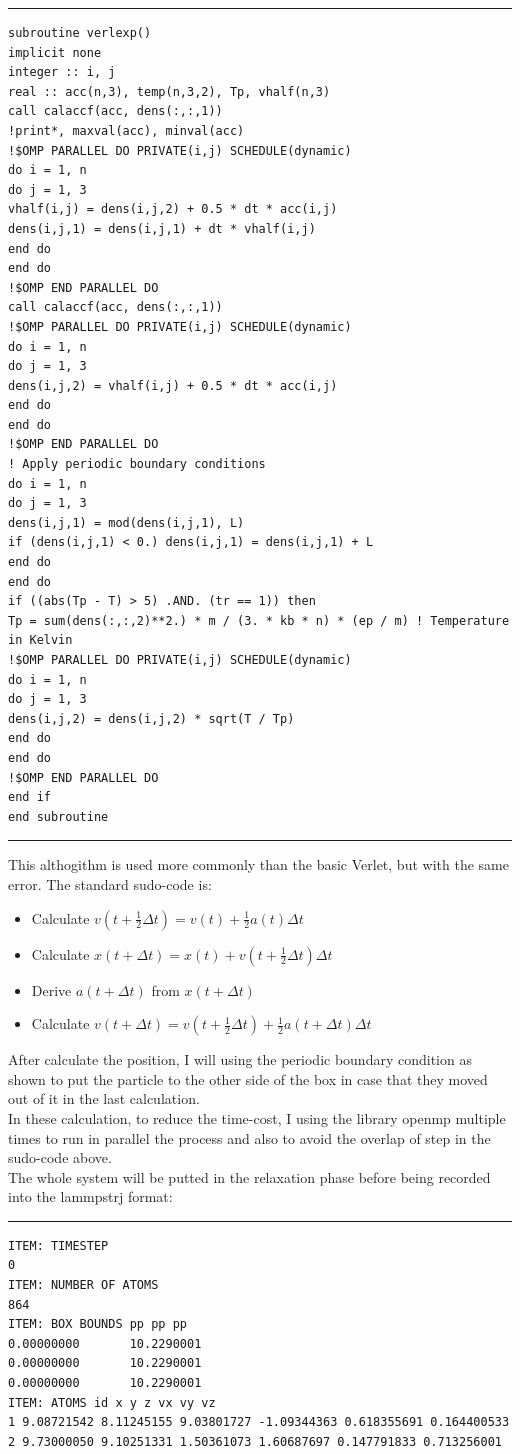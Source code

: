 \documentclass[a4paper]{article}
\begin{document}
\rule{\textwidth}{1pt}
{\small
\begin{lstlisting}
subroutine verlexp()
implicit none
integer :: i, j
real :: acc(n,3), temp(n,3,2), Tp, vhalf(n,3)
call calaccf(acc, dens(:,:,1))
!print*, maxval(acc), minval(acc)
!$OMP PARALLEL DO PRIVATE(i,j) SCHEDULE(dynamic)
do i = 1, n
do j = 1, 3
vhalf(i,j) = dens(i,j,2) + 0.5 * dt * acc(i,j)
dens(i,j,1) = dens(i,j,1) + dt * vhalf(i,j)
end do
end do
!$OMP END PARALLEL DO
call calaccf(acc, dens(:,:,1))
!$OMP PARALLEL DO PRIVATE(i,j) SCHEDULE(dynamic)
do i = 1, n
do j = 1, 3
dens(i,j,2) = vhalf(i,j) + 0.5 * dt * acc(i,j)
end do
end do
!$OMP END PARALLEL DO
! Apply periodic boundary conditions
do i = 1, n
do j = 1, 3
dens(i,j,1) = mod(dens(i,j,1), L)
if (dens(i,j,1) < 0.) dens(i,j,1) = dens(i,j,1) + L
end do
end do
if ((abs(Tp - T) > 5) .AND. (tr == 1)) then
Tp = sum(dens(:,:,2)**2.) * m / (3. * kb * n) * (ep / m) ! Temperature in Kelvin
!$OMP PARALLEL DO PRIVATE(i,j) SCHEDULE(dynamic)
do i = 1, n
do j = 1, 3
dens(i,j,2) = dens(i,j,2) * sqrt(T / Tp)
end do
end do
!$OMP END PARALLEL DO
end if
end subroutine
\end{lstlisting}}
\rule{\textwidth}{1pt}
This althogithm is used more commonly than the basic Verlet, but with the same error. The standard sudo-code is:
\begin{itemize}
\item Calculate \(v(t + \frac{1}{2} \Delta t)  = v(t)  + \frac{1}{2} a(t)\Delta t\)
\item Calculate \(x(t + \Delta t) = x(t) + v(t + \frac{1}{2} \Delta t) \Delta t\)
\item Derive \(a(t+ \Delta t)\) from \(x(t + \Delta t) \)
\item Calculate \(v(t + \Delta t) = v(t + \frac{1}{2} \Delta t) + \frac{1}{2} a ( t+ \Delta t) \Delta t\)
\end{itemize}
\quad After calculate the position, I will using the periodic boundary condition as shown to put the particle to the other side of the box in case that they moved out of it in the last calculation.\\ \null
\quad In these calculation, to reduce the time-cost, I using the library openmp multiple times to run in parallel the process and also to avoid the overlap of step in the sudo-code above.\\\null
The whole system will be putted in the relaxation phase before being recorded into the lammpstrj format:

\rule{\textwidth}{1pt}
\begin{lstlisting}
ITEM: TIMESTEP
0
ITEM: NUMBER OF ATOMS
864
ITEM: BOX BOUNDS pp pp pp
0.00000000       10.2290001    
0.00000000       10.2290001    
0.00000000       10.2290001    
ITEM: ATOMS id x y z vx vy vz
1 9.08721542 8.11245155 9.03801727 -1.09344363 0.618355691 0.164400533    
2 9.73000050 9.10251331 1.50361073 1.60687697 0.147791833 0.713256001 
\end{lstlisting}
\end{document}
